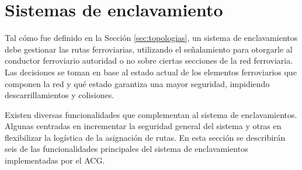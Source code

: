 \section{Sistemas de enclavamiento}
	\label{sec:interlockingTheory}
	
	Tal cómo fue definido en la Sección \ref{sec:topologias}, un sistema de enclavamientos debe gestionar las rutas ferroviarias, utilizando el señalamiento para otorgarle al conductor ferroviario autoridad o no sobre ciertas secciones de la red ferroviaria. Las decisiones se toman en base al estado actual de los elementos ferroviarios que componen la red y qué estado garantiza una mayor seguridad, impidiendo descarrillamientos y colisiones.
	
	Existen diversas funcionalidades que complementan al sistema de enclavamientos. Algunas centradas en incrementar la seguridad general del sistema y otras en flexibilizar la logística de la asignación de rutas. En esta sección se describirán seis de las funcionalidades principales del sistema de enclavamientos implementadas por el ACG.
	
	
	
	
	
	
	